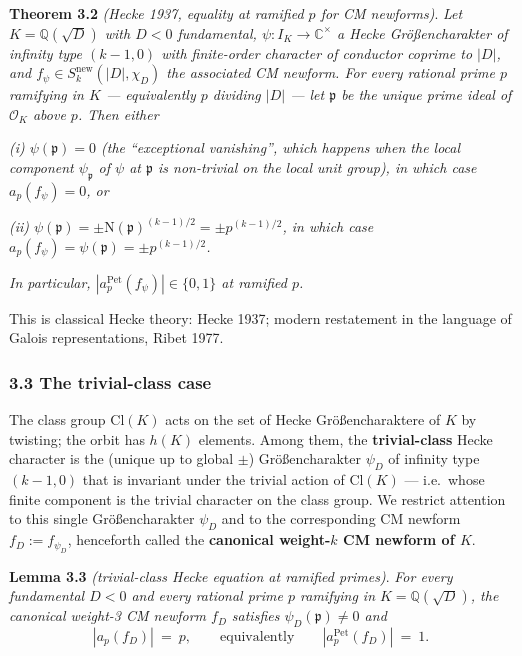 \documentclass[
  11pt,
  a4paper,
]{amsart}
\begin{document}
\textbf{Theorem 3.2} \emph{(Hecke 1937, equality at ramified \(p\) for CM newforms)}. \emph{Let \(K = \mathbb{Q}(\sqrt{D})\) with \(D < 0\) fundamental, \(\psi : I_K \to \mathbb{C}^\times\) a Hecke Größencharakter of infinity type \((k-1, 0)\) with finite-order character of conductor coprime to \(|D|\), and \(f_\psi \in S_k^{\mathrm{new}}(|D|, \chi_D)\) the associated CM newform. For every rational prime \(p\) ramifying in \(K\) --- equivalently \(p\) dividing \(|D|\) --- let \(\mathfrak{p}\) be the unique prime ideal of \(\mathcal{O}_K\) above \(p\). Then either}

\emph{(i) \(\psi(\mathfrak{p}) = 0\) (the ``exceptional vanishing'', which happens when the local component \(\psi_\mathfrak{p}\) of \(\psi\) at \(\mathfrak{p}\) is non-trivial on the local unit group), in which case \(a_p(f_\psi) = 0\), or}

\emph{(ii) \(\psi(\mathfrak{p}) = \pm \mathrm{N}(\mathfrak{p})^{(k-1)/2} = \pm p^{(k-1)/2}\), in which case \(a_p(f_\psi) = \psi(\mathfrak{p}) = \pm p^{(k-1)/2}\).}

\emph{In particular, \(|a_p^{\mathrm{Pet}}(f_\psi)| \in \{0, 1\}\) at ramified \(p\).}

This is classical Hecke theory: Hecke 1937; modern restatement in the language of Galois representations, Ribet 1977.

\hypertarget{the-trivial-class-case}{%
\subsubsection{3.3 The trivial-class case}\label{the-trivial-class-case}}

The class group \(\mathrm{Cl}(K)\) acts on the set of Hecke Größencharaktere of \(K\) by twisting; the orbit has \(h(K)\) elements. Among them, the \textbf{trivial-class} Hecke character is the (unique up to global \(\pm\)) Größencharakter \(\psi_D\) of infinity type \((k-1, 0)\) that is invariant under the trivial action of \(\mathrm{Cl}(K)\) --- i.e.~whose finite component is the trivial character on the class group. We restrict attention to this single Größencharakter \(\psi_D\) and to the corresponding CM newform \(f_D := f_{\psi_D}\), henceforth called the \textbf{canonical weight-\(k\) CM newform of \(K\)}.

\textbf{Lemma 3.3} \emph{(trivial-class Hecke equation at ramified primes)}. \emph{For every fundamental \(D < 0\) and every rational prime \(p\) ramifying in \(K = \mathbb{Q}(\sqrt{D})\), the canonical weight-3 CM newform \(f_D\) satisfies \(\psi_D(\mathfrak{p}) \ne 0\) and}
\[
|a_p(f_D)|\ =\ p, \qquad\text{equivalently}\qquad |a_p^{\mathrm{Pet}}(f_D)|\ =\ 1.
\]
\end{document}
